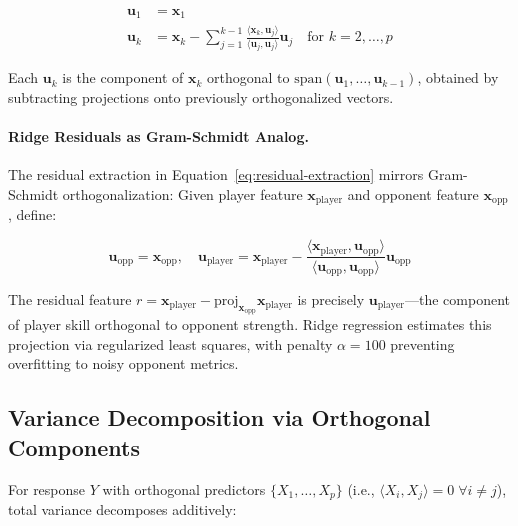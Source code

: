 \begin{equation}
\begin{aligned}
\mathbf{u}_1 &= \mathbf{x}_1 \\
\mathbf{u}_k &= \mathbf{x}_k - \sum_{j=1}^{k-1} \frac{\langle \mathbf{x}_k, \mathbf{u}_j \rangle}{\langle \mathbf{u}_j, \mathbf{u}_j \rangle} \mathbf{u}_j \quad \text{for } k = 2, \ldots, p
\end{aligned}
\label{eq:gram-schmidt}
\end{equation}

Each $\mathbf{u}_k$ is the component of $\mathbf{x}_k$ orthogonal to $\text{span}(\mathbf{u}_1, \ldots, \mathbf{u}_{k-1})$, obtained by subtracting projections onto previously orthogonalized vectors.

\paragraph{Ridge Residuals as Gram-Schmidt Analog.}
The residual extraction in Equation~\ref{eq:residual-extraction} mirrors Gram-Schmidt orthogonalization: Given player feature $\mathbf{x}_{\text{player}}$ and opponent feature $\mathbf{x}_{\text{opp}}$, define:

\begin{equation}
\mathbf{u}_{\text{opp}} = \mathbf{x}_{\text{opp}}, \quad \mathbf{u}_{\text{player}} = \mathbf{x}_{\text{player}} - \frac{\langle \mathbf{x}_{\text{player}}, \mathbf{u}_{\text{opp}} \rangle}{\langle \mathbf{u}_{\text{opp}}, \mathbf{u}_{\text{opp}} \rangle} \mathbf{u}_{\text{opp}}
\label{eq:residual-extraction}
\end{equation}

The residual feature $r = \mathbf{x}_{\text{player}} - \text{proj}_{\mathbf{x}_{\text{opp}}} \mathbf{x}_{\text{player}}$ is precisely $\mathbf{u}_{\text{player}}$---the component of player skill orthogonal to opponent strength. Ridge regression estimates this projection via regularized least squares, with penalty $\alpha = 100$ preventing overfitting to noisy opponent metrics.

\subsection{Variance Decomposition via Orthogonal Components}

For response $Y$ with orthogonal predictors $\{X_1, \ldots, X_p\}$ (i.e., $\langle X_i, X_j \rangle = 0 \; \forall i \neq j$), total variance decomposes additively:

